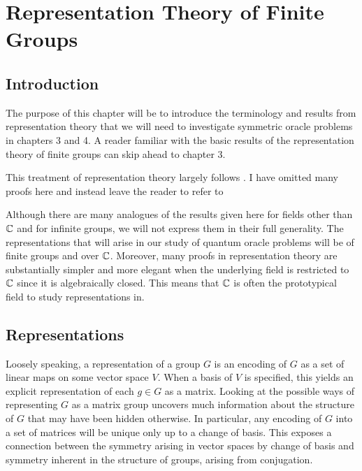 
\chapter{Representation Theory of Finite Groups}

\section{Introduction}



The purpose of this chapter will be to introduce the terminology and results from representation theory that we 
will need to investigate symmetric oracle problems in chapters 3 and 4. A reader familiar with the basic results of 
the representation theory of finite groups can skip ahead to chapter 3. 

This treatment of representation theory largely follows \cite{James&Liebeck}. I have omitted many proofs here and 
instead leave the reader to refer to \cite{James&Liebeck}

Although there are many analogues of the results given here for fields other than $\mathbb{C}$ and for infinite groups, we 
will not express them in their full generality. The representations that will arise in our study of quantum oracle 
problems will be of finite groups and over $\mathbb{C}$. Moreover, many proofs in representation theory are substantially 
simpler and more elegant when the underlying field is restricted to $\mathbb{C}$ since it is algebraically closed. This 
means that $\mathbb{C}$ is often the prototypical field to study representations in.

\section{Representations}

Loosely speaking, a representation of a group $G$ is an encoding of $G$ as a set of linear maps on some vector 
space $V$.  When a basis of $V$ is specified, this yields an explicit representation of each $g \in G$ as a matrix.  
Looking at the possible ways of representing $G$ as a matrix group uncovers much information about the structure of 
$G$ that may have been hidden otherwise. In particular, any encoding of $G$ into a set of matrices will be unique 
only up to a change of basis. This exposes a connection between the symmetry arising in vector spaces by change of 
basis and symmetry inherent in the structure of groups, arising from conjugation.


